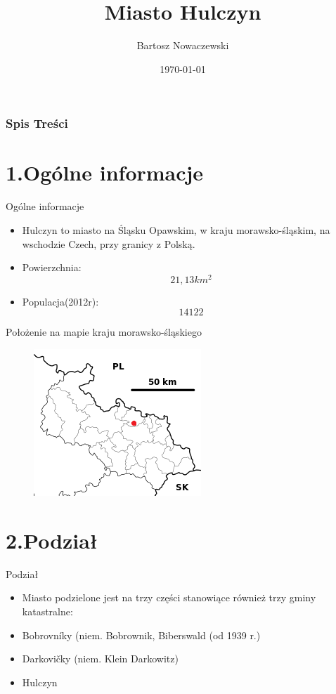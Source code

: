 \documentclass{beamer}
\title{Miasto Hulczyn}
\author{Bartosz Nowaczewski}
\institute{UWM}
\date{\today}
\begin{document}
\frame{\titlepage}



\begin{frame}
\frametitle{Spis Treści}
\tableofcontents
\end{frame}


\section{1.Ogólne informacje}
\begin{frame}{Ogólne informacje}
\begin{itemize}
\item{Hulczyn to miasto na Śląsku Opawskim, w kraju morawsko-śląskim, na wschodzie Czech, przy granicy z Polską.}
\pause
\item Powierzchnia:  
$${21,13 km^2}$$
\pause
\item Populacja(2012r):
$${14 122}$$
\end{itemize}
\end{frame}

\begin{frame}{Położenie na mapie kraju morawsko-śląskiego}
\begin{figure}
\centering
\includegraphics[scale=0.9]{Grafika/Polozenie.png}
\end{figure}
\end{frame}

\section{2.Podział}
\begin{frame}{Podział}
\begin{itemize}
\item{Miasto podzielone jest na trzy części stanowiące również trzy gminy katastralne:}
\pause
\item{Bobrovníky (niem. Bobrownik, Biberswald (od 1939 r.)}
\pause
\item{Darkovičky (niem. Klein Darkowitz)}
\pause
\item{Hulczyn}
\end{itemize}
\end{frame}
\end{document}
